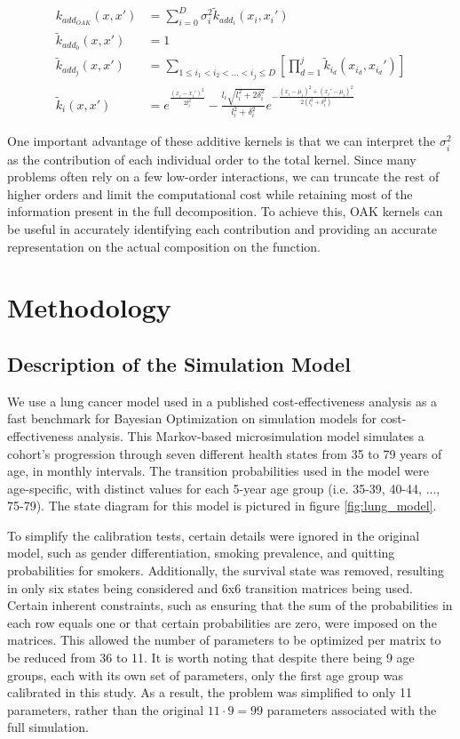 \documentclass{IOS-Book-Article}
\begin{document}
	\begin{equation} \label{eq:additive-orthogonal}
		\begin{aligned}
			k_{add_{OAK}}(x,x') &= \sum_{i=0}^D{\sigma_i^2  \tilde{k}_{add_i}(x_i,x_i')} \\
			\tilde{k}_{add_0}(x,x') &= 1\\
			\tilde{k}_{add_j}(x,x') &= \sum_{1\leq i_1 < i_2 < \ldots < i_j\leq D} \left[\prod_{d=1}^{j} \tilde{k}_{i_d}(x_{i_d},x_{i_d}') \right]\\		
			\tilde{k}_i(x,x') &= e^{\frac{(x_i-x_i')^2}{2l_i^2}} - \frac{l_i\sqrt{l_i^2 + 2\delta_i^2}}{l_i^2 + \delta_i^2} e^{-\frac{(x_i-\mu_i)^2 + (x_i'-\mu_i)^2}{2(l_i^2 + \delta_i^2)}}
		\end{aligned}
	\end{equation}
	
	One important advantage of these additive kernels is that we can interpret the $\sigma_i^2$ as the contribution of each individual order to the total kernel. Since many problems often rely on a few low-order interactions, we can truncate the rest of higher orders and limit the computational cost while retaining most of the information present in the full decomposition. To achieve this, OAK kernels can be useful in accurately identifying each contribution and providing an accurate representation on the actual composition on the function.
	
	\section{Methodology}
	\subsection{Description of the Simulation Model}
	We use a lung cancer model used in a published cost-effectiveness analysis\cite{lung-model} as a fast benchmark for Bayesian Optimization on simulation models for cost-effectiveness analysis. This Markov-based microsimulation model simulates a cohort's progression through seven different health states from 35 to 79 years of age, in monthly intervals. The transition probabilities used in the model were age-specific, with distinct values for each 5-year age group (i.e. 35-39, 40-44, ..., 75-79). The state diagram for this model is pictured in figure \ref{fig:lung_model}.
		
	To simplify the calibration tests, certain details were ignored in the original model, such as gender differentiation, smoking prevalence, and quitting probabilities for smokers. Additionally, the survival state was removed, resulting in only six states being considered and 6x6 transition matrices being used. Certain inherent constraints, such as ensuring that the sum of the probabilities in each row equals one or that certain probabilities are zero, were imposed on the matrices. This allowed the number of parameters to be optimized per matrix to be reduced from 36 to 11. It is worth noting that despite there being 9 age groups, each with its own set of parameters, only the first age group was calibrated in this study. As a result, the problem was simplified to only 11 parameters, rather than the original $11\cdot 9=99$ parameters associated with the full simulation.
	
\end{document}
